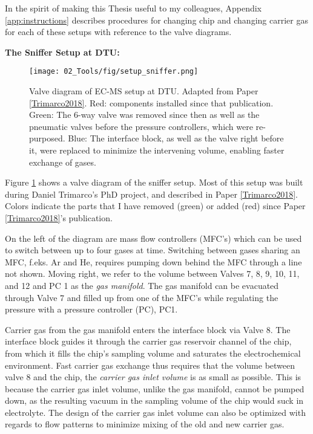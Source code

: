 In the spirit of making this Thesis useful to my colleagues, Appendix \ref{app:instructions} describes procedures for changing chip and changing carrier gas for each of these setups with reference to the valve diagrams.

\vspace{1cm}
\textbf{\large The Sniffer Setup at DTU:}

\begin{figure}[h!]
	\texttt{[image: 02\_Tools/fig/setup\_sniffer.png]}
	\caption{Valve diagram of EC-MS setup at DTU. Adapted from Paper \ref{Trimarco2018}. Red: components installed since that publication. Green: The 6-way valve was removed since then as well as the pneumatic valves before the pressure controllers, which were re-purposed. Blue: The interface block, as well as the valve right before it, were replaced to minimize the intervening volume, enabling faster exchange of gases.}
	\label{fig:sniffer}
\end{figure}
Figure \ref{fig:sniffer} shows a valve diagram of the sniffer setup. Most of this setup was built during Daniel Trimarco's PhD project\cite{Trimarco2017_PhD}, and described in Paper \ref{Trimarco2018}. Colors indicate the parts that I have removed (green) or added (red) since Paper \ref{Trimarco2018}'s publication.

On the left of the diagram are mass flow controllers (MFC's) which can be used to switch between up to four gases at time. Switching between gases sharing an MFC, f.eks. Ar and He, requires pumping down behind the MFC through a line not shown. Moving right, we refer to the volume between Valves 7, 8, 9, 10, 11, and 12 and PC 1 as the \textit{gas manifold}. The gas manifold can be evacuated through Valve 7 and filled up from one of the MFC's while regulating the pressure with a pressure controller (PC), PC1.

Carrier gas from the gas manifold enters the interface block via Valve 8. The interface block guides it through the carrier gas reservoir channel of the chip, from which it fills the chip's sampling volume and saturates the electrochemical environment. Fast carrier gas exchange thus requires that the volume between valve 8 and the chip, the \textit{carrier gas inlet volume} is as small as possible. This is because the carrier gas inlet volume, unlike the gas manifold, cannot be pumped down, as the resulting vacuum in the sampling volume of the chip would suck in electrolyte. The design of the carrier gas inlet volume can also be optimized with regards to flow patterns to minimize mixing of the old and new carrier gas. 

